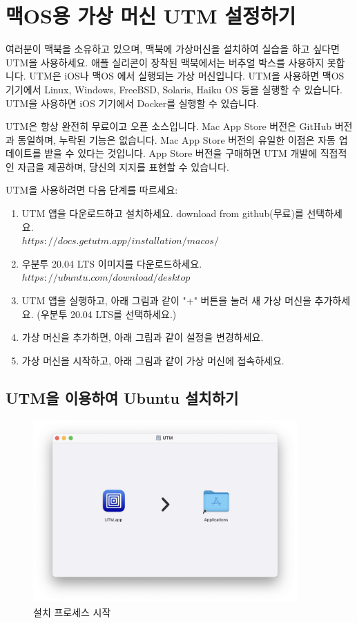 \section*{맥OS용 가상 머신 UTM 설정하기}
여러분이 맥북을 소유하고 있으며, 맥북에 가상머신을 설치하여 실습을 하고 싶다면 UTM을 사용하세요. 애플 실리콘이 장착된 맥북에서는 버추얼 박스를 사용하지 못합니다. UTM은 iOS나 맥OS 에서 실행되는 가상 머신입니다. UTM을 사용하면 맥OS 기기에서 Linux, Windows, FreeBSD, Solaris, Haiku OS 등을 실행할 수 있습니다. UTM을 사용하면 iOS 기기에서 Docker를 실행할 수 있습니다. 

UTM은 항상 완전히 무료이고 오픈 소스입니다. Mac App Store 버전은 GitHub 버전과 동일하며, 누락된 기능은 없습니다. Mac App Store 버전의 유일한 이점은 자동 업데이트를 받을 수 있다는 것입니다. App Store 버전을 구매하면 UTM 개발에 직접적인 자금을 제공하며, 당신의 지지를 표현할 수 있습니다.

UTM을 사용하려면 다음 단계를 따르세요:
\begin{enumerate}
    \item UTM 앱을 다운로드하고 설치하세요. download from github(무료)를 선택하세요. \\$https://docs.getutm.app/installation/macos/$
    \item 우분투 20.04 LTS 이미지를 다운로드하세요. \\$https://ubuntu.com/download/desktop$
    \item UTM 앱을 실행하고, 아래 그림과 같이 "+" 버튼을 눌러 새 가상 머신을 추가하세요. (우분투 20.04 LTS를 선택하세요.)
    \item 가상 머신을 추가하면, 아래 그림과 같이 설정을 변경하세요.
    \item 가상 머신을 시작하고, 아래 그림과 같이 가상 머신에 접속하세요.
\end{enumerate}

\subsection{UTM을 이용하여 Ubuntu 설치하기}

\begin{figure}[htbp]
    \centering
    \includegraphics[width=0.9\textwidth]{images/chapter2Images/ch2_image_01.png}
    \caption{설치 프로세스 시작}
\end{figure}

